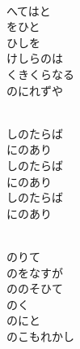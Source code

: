 \documentclass[10pt,b5j]{tarticle} %
\begin{document}
\begin{enumerate}
\begin{minipage}[c]{\blocksize}
    \end{minipage}
    \begin{minipage}[c]{\blocksize}
        
        \vspace{\linespace}
        \item~\\
        へてはと\\
        をひと\\
        ひしを\\
        けしらのは\\
        くきくらなる\\
        のにれずや
        
    \end{minipage}
    \begin{minipage}[c]{\blocksize}
        
        \vspace{\linespace}
        \item~\\
        しのたらば\\
        にのあり\\
        しのたらば\\
        にのあり\\
        しのたらば\\
        にのあり
        
    \end{minipage}
    \begin{minipage}[c]{\blocksize}
        
        \vspace{\linespace}
        \item~\\
        のりて\\
        のをなすが\\
        ののそひて\\
        のく\\
        のにと\\
        のこもれかし
    
    \end{minipage}
\end{enumerate} %
\end{document}
